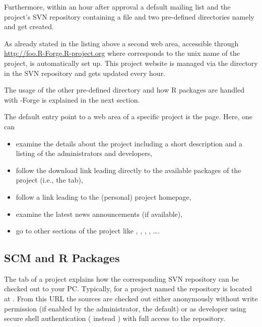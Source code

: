 Furthermore, within an hour after approval a default mailing list and
the project's SVN repository containing a  file and two
pre-defined directories namely  and  get created. 

As already stated in the listing above a second web area, accessible 
through \url{http://foo.R-Forge.R-project.org} where 
corresponds to the unix name of the project, is automatically
set up. This project website is managed via the  directory
in the SVN repository and gets updated every hour.

The usage of the other pre-defined directory  and how R
packages are handled with \R-Forge is explained in the next
section.



The default entry point to a web area of a specific project is
the  page. Here, one can 

\begin{itemize}
\item examine the details about the project including a short
  description and a listing of the administrators and developers,
\item follow the download link leading directly to the available packages
  of the project (i.e., the  tab),
\item follow a link leading to the (personal) project homepage,
\item examine the latest news announcements (if available),
\item go to other sections of the project like
  , ,
   , , \ldots{}.
\end{itemize}



\subsection{SCM and R Packages}

The  tab of a project explains how the corresponding SVN
repository can be checked out to your
PC. Typically, for a project named  the repository is
located at . From
this URL the sources are checked out either 
anonymously without write permission (if enabled by the
administrator, the default) or as developer using secure shell
authentication ( instead ) with full
access to the repository.

